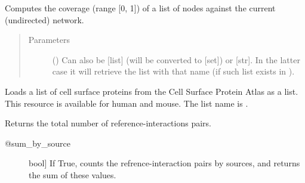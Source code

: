 \documentclass[letterpaper,10pt,english]{sphinxmanual}
\begin{document}
\begin{fulllineitems}
\begin{fulllineitems}
\label{\detokenize{reference:pypath.main.PyPath.coverage}}
Computes the coverage (range {[}0, 1{]}) of a list of nodes against
the current (undirected) network.
\begin{quote}\begin{description}
\item[{Parameters}] \leavevmode
{} () \textendash{} Can also be {[}list{]} (will be converted to {[}set{]}) or {[}str{]}. In
the latter case it will retrieve the list with that name (if
such list exists in ).

\end{description}\end{quote}

\end{fulllineitems}


\begin{fulllineitems}
\label{\detokenize{reference:pypath.main.PyPath.cspa_list}}
Loads a list of cell surface proteins from the Cell Surface Protein
Atlas as a list. This resource is available for human and mouse.
The list name is .

\end{fulllineitems}


\begin{fulllineitems}
\label{\detokenize{reference:pypath.main.PyPath.curation_effort}}
Returns the total number of reference-interactions pairs.
\begin{description}
\item[{@sum\_by\_source}] \leavevmode{[}bool{]}
If True, counts the refrence-interaction pairs by
sources, and returns the sum of these values.

\end{description}


\end{fulllineitems}
\end{fulllineitems}
\end{document}
